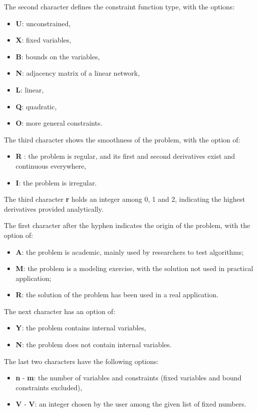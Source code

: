The second character defines the constraint function type, with the options: 
\begin{itemize}  \itemsep -8pt 
\item  \textbf{U}: unconstrained,
\item  \textbf{X}: fixed variables, 
\item  \textbf{B}: bounds on the variables,
\item  \textbf{N}: adjacency matrix of a linear network,
\item  \textbf{L}: linear, 
\item  \textbf{Q}: quadratic,
\item  \textbf{O}: more general constraints. 
\end{itemize}

The third character shows the smoothness of the problem, with the option of:
\begin{itemize}  \itemsep -8pt 
\item  \textbf{R} : the problem is regular, and its first and second derivatives exist and continuous everywhere,
\item  \textbf{I}: the problem is irregular.
\end{itemize}

The third character \textbf{r} holds an integer among 0, 1 and 2, indicating the highest derivatives provided analytically.

The first character after the hyphen indicates the origin of the problem, with the option of:
\begin{itemize}  \itemsep -8pt 
\item  \textbf{A}: the problem is academic, mainly used by researchers to test algorithms; 
\item  \textbf{M}: the problem is a modeling exercise, with the solution not used in practical application; 
\item  \textbf{R}: the solution of the problem has been used in a real application.  
\end{itemize}

The next character has an option of: 
\begin{itemize}  \itemsep -8pt 
\item \textbf{Y}: the problem contains internal variables, 
\item \textbf{N}: the problem does not contain internal variables. 
\end{itemize}

The last two characters have the following options:
\begin{itemize}  \itemsep -8pt 
\item \textbf{n} - \textbf{m}: the number of variables and constraints (fixed variables and bound constraints excluded), 
\item \textbf{V} - \textbf{V}: an integer chosen by the user among the given list of fixed numbers.
\end{itemize}
